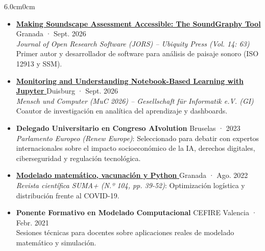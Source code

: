 \documentclass[10pt, a4paper]{article}
\begin{document}
\begin{adjustwidth}{6.0cm}{0cm}
\begin{itemize}[leftmargin=*, nosep, topsep=1pt, itemsep=2pt]
    \item \href{https://doi.org/10.5334/jors.771}{\textbf{\color{darktext}\footnotesize Making Soundscape Assessment Accessible: The SoundGraphy Tool \faExternalLink*}} \hfill {\scriptsize\color{lightgray} Granada · Sept. 2026}\\
    {\scriptsize\textit{Journal of Open Research Software (JORS) -- Ubiquity Press (Vol. 14: 63)}}\\
    {\scriptsize Primer autor y desarrollador de software para análisis de paisaje sonoro (ISO 12913 y SSM).}
    \item \href{https://dl.gi.de/items/4b863f76-35d4-4ec3-a18b-427b56539919}{\textbf{\color{darktext}\footnotesize Monitoring and Understanding Notebook-Based Learning with Jupyter \faExternalLink*}} \hfill {\scriptsize\color{lightgray} Duisburg · Sept. 2026}\\
    {\scriptsize\textit{Mensch und Computer (MuC 2026) -- Gesellschaft für Informatik e.V. (GI)}}\\
    {\scriptsize Coautor de investigación en analítica del aprendizaje y dashboards.}
    \item \textbf{\color{darktext}\footnotesize Delegado Universitario en Congreso AIvolution} \hfill {\scriptsize\color{lightgray} Bruselas · 2023}\\
    {\scriptsize\textit{Parlamento Europeo (Renew Europe)}: Seleccionado para debatir con expertos internacionales sobre el impacto socioeconómico de la IA, derechos digitales, ciberseguridad y regulación tecnológica.}
    \item \href{https://revistasuma.es/wp-content/uploads/suma/Suma104/S104w_039-052.pdf}{\textbf{\color{darktext}\footnotesize Modelado matemático, vacunación y Python \faExternalLink*}} \hfill {\scriptsize\color{lightgray} Granada · Ago. 2022}\\
    {\scriptsize\textit{Revista científica SUMA+ (N.º 104, pp. 39-52)}: Optimización logística y distribución frente al COVID-19.}
    \item \textbf{\color{darktext}\footnotesize Ponente Formativo en Modelado Computacional} \hfill {\scriptsize\color{lightgray} CEFIRE Valencia · Febr. 2021}\\
    {\scriptsize Sesiones técnicas para docentes sobre aplicaciones reales de modelado matemático y simulación.}
\end{itemize}



\end{adjustwidth}
\end{document}
